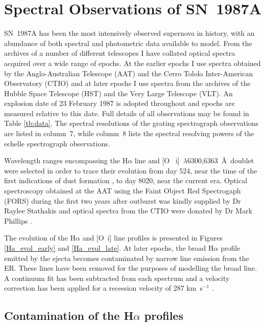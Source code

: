 \section{Spectral Observations of SN~1987A}
\label{spectra}


SN~1987A has been the most intensively observed supernova in history, with 
an abundance of both spectral and photometric data available to model.  From 
the archives of a number of different telescopes I have collated optical 
spectra acquired over a wide range of epochs.  At the earlier epochs I 
use spectra obtained by the Anglo-Australian Telescope (AAT) and the Cerro 
Tololo Inter-American Observatory (CTIO) and at later epochs I 
use spectra from the archives of the Hubble Space Telescope (HST) and the Very 
Large Telescope (VLT).  An explosion date of 23 February 1987 is adopted 
throughout and epochs are measured relative to this date.  Full details of 
all observations may be found in Table \ref{tb:data}. The spectral 
resolutions of the grating spectrograph observations are listed in 
column~7, while column~8 lists the spectral resolving powers of the 
echelle spectrograph observations.


Wavelength ranges encompassing the H$\alpha$ line and [O~{\sc 
i}]~$\lambda$6300,6363~\AA\ doublet were selected in order to trace their 
evolution from day 524, near the time of the first indications of dust 
formation \citep{Wooden1993}, to day 8020, near the current era. Optical 
spectroscopy obtained at the AAT using the Faint Object Red Spectrogaph 
(FORS) during the first two years after outburst was kindly supplied by Dr 
Raylee Stathakis \citep{Spyromilio1991, Hanuschik1993, Spyromilio1993} and 
optical spectra from the CTIO were donated by Dr Mark Phillips 
\citep{Suntzeff1991}.

The evolution of the H$\alpha$ and [O~{\sc i}] line profiles is presented 
in Figures \ref{Ha_evol_early} and \ref{Ha_evol_late}.  At later epochs, 
the broad H$\alpha$ profile emitted by the ejecta becomes contaminated by 
narrow line emission from the ER.  These lines have been 
removed for the purposes of modelling the broad line. A continuum fit has 
been subtracted from each spectrum and a velocity correction has been 
applied for a recession velocity of 287 km~s$^{-1}$ 
\citep{Groningsson2008}.




\subsection{Contamination of the H$\alpha$ profiles}

